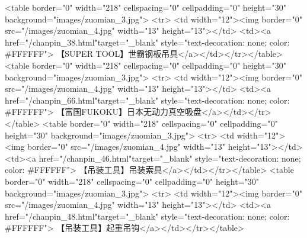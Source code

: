                                                             <table border="0" width="218" cellspacing="0" cellpadding="0" height="30" background="images/zuomian_3.jpg">
                                                                <tr>
                                                                    <td width="12"><img border="0" src="/images/zuomian_4.jpg" width="13" height="13"></td>
                                                                    <td><a href="/chanpin_38.html"target="_blank" style="text-decoration: none; color: #FFFFFF">
                                                                            【SUPER TOOL】世霸钢板吊具</a></td></tr></table>
                                                            <table border="0" width="218" cellspacing="0" cellpadding="0" height="30" background="images/zuomian_3.jpg">
                                                                <tr>
                                                                    <td width="12"><img border="0" src="/images/zuomian_4.jpg" width="13" height="13"></td>
                                                                    <td><a href="/chanpin_66.html"target="_blank" style="text-decoration: none; color: #FFFFFF">
                                                                            【富国FUKOKU】日本无动力真空吸盘</a></td></tr></table>
                                                            <table border="0" width="218" cellspacing="0" cellpadding="0" height="30" background="images/zuomian_3.jpg">
                                                                <tr>
                                                                    <td width="12"><img border="0" src="/images/zuomian_4.jpg" width="13" height="13"></td>
                                                                    <td><a href="/chanpin_46.html"target="_blank" style="text-decoration: none; color: #FFFFFF">
                                                                            【吊装工具】吊装索具</a></td></tr></table>
                                                            <table border="0" width="218" cellspacing="0" cellpadding="0" height="30" background="images/zuomian_3.jpg">
                                                                <tr>
                                                                    <td width="12"><img border="0" src="/images/zuomian_4.jpg" width="13" height="13"></td>
                                                                    <td><a href="/chanpin_48.html"target="_blank" style="text-decoration: none; color: #FFFFFF">
                                                                            【吊装工具】起重吊钩</a></td></tr></table>
